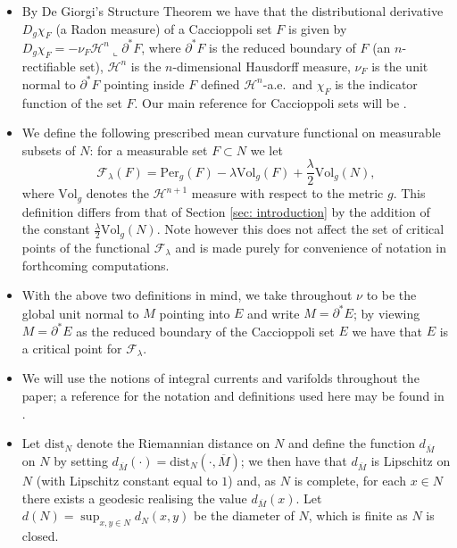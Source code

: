 \documentclass[11pt]{article}
\begin{document}
\begin{itemize}
    \item By De Giorgi’s Structure Theorem we have
    that the distributional derivative $D_g \chi_F$ (a Radon measure) of a Caccioppoli set $F$ is given by $D_g \chi_F = -\nu_F \mathcal{H}^n \llcorner \partial^{*} F$, where $\partial^{*} F$ is the reduced boundary of $F$ (an
    $n$-rectifiable set), $\mathcal{H}^n$ is the $n$-dimensional Hausdorff measure, $\nu_F$ is the unit normal to $\partial^{*}F$ pointing inside $F$ defined $\mathcal{H}^n$-a.e.~and $\chi_F$ is the indicator function of the set $F$. Our main reference for Caccioppoli sets will be \cite{maggi_2012}. 

    \item We define the following prescribed mean curvature functional on measurable subsets of $N$: for a measurable set $F \subset N$ we let
    \begin{equation*}
    \mathcal{F}_\lambda(F) = \mathrm{Per}_g(F) - \lambda \mathrm{Vol}_g(F) + \frac{\lambda}{2}\mathrm{Vol}_g(N),
    \end{equation*}
    where $\mathrm{Vol}_g$ denotes the $\mathcal{H}^{n+1}$ measure with respect to the metric $g$. This definition differs from that of Section \ref{sec: introduction} by the addition of the constant $\frac{\lambda}{2}\mathrm{Vol}_g(N)$. Note however this does not affect the set of critical points of the functional $\mathcal{F}_\lambda$ and is made purely for convenience of notation in forthcoming computations.

    \item With the above two definitions in mind, we take throughout $\nu$ to be the global unit normal to $M$ pointing into $E$ and write $M = \partial^* E$; by viewing $M = \partial^* E$ as the reduced boundary of the Caccioppoli set $E$ we have that $E$ is a critical point for $\mathcal{F}_\lambda$.

    \item We will use the notions of integral currents and varifolds throughout the paper; a reference for the notation and definitions used here may be found in \cite{simongmt}.

    \item Let $\mathrm{dist}_N$ denote the Riemannian distance on $N$ and define the function $d_{\overline{M}}$ on $N$ by setting $d_{\overline{M}} (\cdot) = \mathrm{dist}_N (\cdot, \overline{M})$; we then have that $d_{\overline{M}}$ is Lipschitz on $N$ (with Lipschitz constant equal to $1$) and, as $N$ is complete, for each $x \in N$ there exists a geodesic realising the value $d_{\overline{M}} (x)$. Let $d(N) = \sup_{x,y \in N} d_N(x,y)$ be the diameter of $N$, which is finite as $N$ is closed.


\end{itemize}
\end{document}
